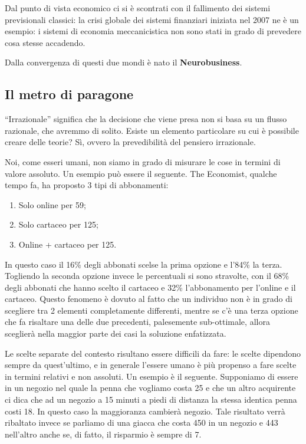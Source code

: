 Dal punto di vista economico ci si è scontrati con il fallimento dei sistemi
previsionali classici: la crisi globale dei sistemi finanziari iniziata nel
2007 ne è un esempio: i sistemi di economia meccanicistica non sono stati in
grado di prevedere cosa stesse accadendo.

Dalla convergenza di questi due mondi è nato il \textbf{Neurobusiness}.

\subsection{Il metro di paragone}

``Irrazionale'' significa che la decisione che viene presa non si basa su un
flusso razionale, che avremmo di solito. Esiste un elemento particolare su cui
è possibile creare delle teorie? Sì, ovvero la prevedibilità del pensiero
irrazionale.

Noi, come esseri umani, non siamo in grado di misurare le cose in termini di
valore assoluto.
Un esempio può essere il seguente. The Economist, qualche tempo fa, ha 
proposto 3 tipi di abbonamenti:
\begin{enumerate}
 \item Solo online per 59\textdollar{};
 \item Solo cartaceo per 125\textdollar{};
 \item Online + cartaceo per 125\textdollar{}.
\end{enumerate}
In questo caso il 16\% degli abbonati scelse la prima opzione e l'84\% la terza.
Togliendo la seconda opzione invece le percentuali si sono stravolte, con il
68\% degli abbonati che hanno scelto il cartaceo e 32\% l'abbonamento per
l'online e il cartaceo. 
Questo fenomeno è dovuto al fatto che un individuo non è in grado di scegliere
tra 2 elementi completamente differenti, mentre se c'è una terza opzione che fa
risaltare una delle due precedenti, palesemente sub-ottimale, allora sceglierà
nella maggior parte dei casi la soluzione enfatizzata.

Le scelte separate del contesto risultano essere difficili da fare: le scelte
dipendono sempre da quest'ultimo, e in generale l'essere umano è più propenso 
a fare scelte in termini relativi e non assoluti.
Un esempio è il seguente. Supponiamo di essere in un negozio nel quale
la penna che vogliamo costa 25\textdollar{} e che un altro acquirente ci dica
che ad un negozio a 15 minuti a piedi di distanza la stessa identica penna
costi 18\textdollar{}. In questo caso la maggioranza cambierà negozio. Tale
risultato verrà ribaltato invece se parliamo di una giacca che costa
450\textdollar{} in un negozio e 443\textdollar{} nell'altro anche se, di
fatto, il risparmio è sempre di 7\textdollar{}.

